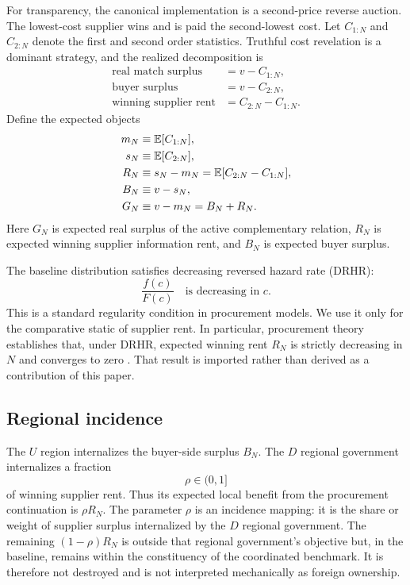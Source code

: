 For transparency, the canonical implementation is a second-price reverse auction. The lowest-cost supplier wins and is paid the second-lowest cost. Let $C_{1:N}$ and $C_{2:N}$ denote the first and second order statistics. Truthful cost revelation is a dominant strategy, and the realized decomposition is
\begin{align}
\text{real match surplus} &= v-C_{1:N},\\
\text{buyer surplus} &= v-C_{2:N},\\
\text{winning supplier rent} &= C_{2:N}-C_{1:N}.
\end{align}
Define the expected objects
\begin{align}
m_N &\equiv \mathbb{E}[C_{1:N}],\label{eq:mN}\\
s_N &\equiv \mathbb{E}[C_{2:N}],\label{eq:sN}\\
R_N &\equiv s_N-m_N=\mathbb{E}[C_{2:N}-C_{1:N}],\label{eq:RN}\\
B_N &\equiv v-s_N,\label{eq:BN}\\
G_N &\equiv v-m_N=B_N+R_N.\label{eq:GN}
\end{align}
Here $G_N$ is expected real surplus of the active complementary relation, $R_N$ is expected winning supplier information rent, and $B_N$ is expected buyer surplus.

The baseline distribution satisfies decreasing reversed hazard rate (DRHR):
\begin{equation}
\frac{f(c)}{F(c)}\quad\text{is decreasing in }c.
\label{eq:drhr}
\end{equation}
This is a standard regularity condition in procurement models. We use it only for the comparative static of supplier rent. In particular, procurement theory establishes that, under DRHR, expected winning rent $R_N$ is strictly decreasing in $N$ and converges to zero \citep{Li2005,XuLi2019}. That result is imported rather than derived as a contribution of this paper.

\subsection{Regional incidence}

The $U$ region internalizes the buyer-side surplus $B_N$. The $D$ regional government internalizes a fraction
\begin{equation}
\rho\in(0,1]
\end{equation}
of winning supplier rent. Thus its expected local benefit from the procurement continuation is $\rho R_N$. The parameter $\rho$ is an incidence mapping: it is the share or weight of supplier surplus internalized by the $D$ regional government. The remaining $(1-\rho)R_N$ is outside that regional government's objective but, in the baseline, remains within the constituency of the coordinated benchmark. It is therefore not destroyed and is not interpreted mechanically as foreign ownership.

